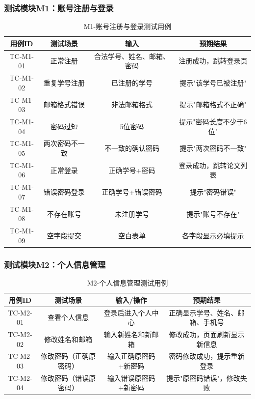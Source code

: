 \subsubsection{测试模块M1：账号注册与登录}

\begin{table}[htbp]
    \centering
    \caption{M1-账号注册与登录测试用例}
    \begin{tabular}{|c|c|c|c|}
        \hline
        \textbf{用例ID} & \textbf{测试场景} & \textbf{输入} & \textbf{预期结果} \\
        \hline
        TC-M1-01 & 正常注册 & 合法学号、姓名、邮箱、密码 & 注册成功，跳转登录页 \\
        \hline
        TC-M1-02 & 重复学号注册 & 已注册的学号 & 提示"该学号已被注册" \\
        \hline
        TC-M1-03 & 邮箱格式错误 & 非法邮箱格式 & 提示"邮箱格式不正确" \\
        \hline
        TC-M1-04 & 密码过短 & 5位密码 & 提示"密码长度不少于6位" \\
        \hline
        TC-M1-05 & 两次密码不一致 & 不一致的确认密码 & 提示"两次密码不一致" \\
        \hline
        TC-M1-06 & 正常登录 & 正确学号+密码 & 登录成功，跳转论文列表 \\
        \hline
        TC-M1-07 & 错误密码登录 & 正确学号+错误密码 & 提示"密码错误" \\
        \hline
        TC-M1-08 & 不存在账号 & 未注册学号 & 提示"账号不存在" \\
        \hline
        TC-M1-09 & 空字段提交 & 空白表单 & 各字段显示必填提示 \\
        \hline
    \end{tabular}
\end{table}

\subsubsection{测试模块M2：个人信息管理}

\begin{table}[htbp]
    \centering
    \caption{M2-个人信息管理测试用例}
    \begin{tabular}{|c|c|c|c|}
        \hline
        \textbf{用例ID} & \textbf{测试场景} & \textbf{输入/操作} & \textbf{预期结果} \\
        \hline
        TC-M2-01 & 查看个人信息 & 登录后进入个人中心 & 正确显示学号、姓名、邮箱、手机号 \\
        \hline
        TC-M2-02 & 修改姓名和邮箱 & 输入新姓名和新邮箱 & 修改成功，页面刷新显示新信息 \\
        \hline
        TC-M2-03 & 修改密码（正确原密码） & 输入正确原密码+新密码 & 密码修改成功，提示重新登录 \\
        \hline
        TC-M2-04 & 修改密码（错误原密码） & 输入错误原密码+新密码 & 提示"原密码错误"，修改失败 \\
        \hline
    \end{tabular}
\end{table}

